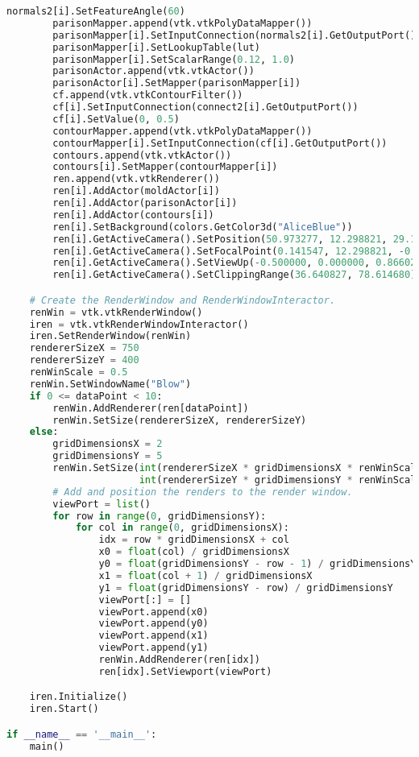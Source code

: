 \begin{lstlisting}[language=Python, caption={Script to generate the blow molding image.}, escapechar=\$]
        normals2[i].SetFeatureAngle(60)
        parisonMapper.append(vtk.vtkPolyDataMapper())
        parisonMapper[i].SetInputConnection(normals2[i].GetOutputPort())
        parisonMapper[i].SetLookupTable(lut)
        parisonMapper[i].SetScalarRange(0.12, 1.0)
        parisonActor.append(vtk.vtkActor())
        parisonActor[i].SetMapper(parisonMapper[i])
        cf.append(vtk.vtkContourFilter())
        cf[i].SetInputConnection(connect2[i].GetOutputPort())
        cf[i].SetValue(0, 0.5)
        contourMapper.append(vtk.vtkPolyDataMapper())
        contourMapper[i].SetInputConnection(cf[i].GetOutputPort())
        contours.append(vtk.vtkActor())
        contours[i].SetMapper(contourMapper[i])
        ren.append(vtk.vtkRenderer())
        ren[i].AddActor(moldActor[i])
        ren[i].AddActor(parisonActor[i])
        ren[i].AddActor(contours[i])
        ren[i].SetBackground(colors.GetColor3d("AliceBlue"))
        ren[i].GetActiveCamera().SetPosition(50.973277, 12.298821, 29.102547)
        ren[i].GetActiveCamera().SetFocalPoint(0.141547, 12.298821, -0.245166)
        ren[i].GetActiveCamera().SetViewUp(-0.500000, 0.000000, 0.866025)
        ren[i].GetActiveCamera().SetClippingRange(36.640827, 78.614680)

    # Create the RenderWindow and RenderWindowInteractor.
    renWin = vtk.vtkRenderWindow()
    iren = vtk.vtkRenderWindowInteractor()
    iren.SetRenderWindow(renWin)
    rendererSizeX = 750
    rendererSizeY = 400
    renWinScale = 0.5
    renWin.SetWindowName("Blow")
    if 0 <= dataPoint < 10:
        renWin.AddRenderer(ren[dataPoint])
        renWin.SetSize(rendererSizeX, rendererSizeY)
    else:
        gridDimensionsX = 2
        gridDimensionsY = 5
        renWin.SetSize(int(rendererSizeX * gridDimensionsX * renWinScale),
                       int(rendererSizeY * gridDimensionsY * renWinScale))
        # Add and position the renders to the render window.
        viewPort = list()
        for row in range(0, gridDimensionsY):
            for col in range(0, gridDimensionsX):
                idx = row * gridDimensionsX + col
                x0 = float(col) / gridDimensionsX
                y0 = float(gridDimensionsY - row - 1) / gridDimensionsY
                x1 = float(col + 1) / gridDimensionsX
                y1 = float(gridDimensionsY - row) / gridDimensionsY
                viewPort[:] = []
                viewPort.append(x0)
                viewPort.append(y0)
                viewPort.append(x1)
                viewPort.append(y1)
                renWin.AddRenderer(ren[idx])
                ren[idx].SetViewport(viewPort)

    iren.Initialize()
    iren.Start()

if __name__ == '__main__':
    main()
\end{lstlisting}

